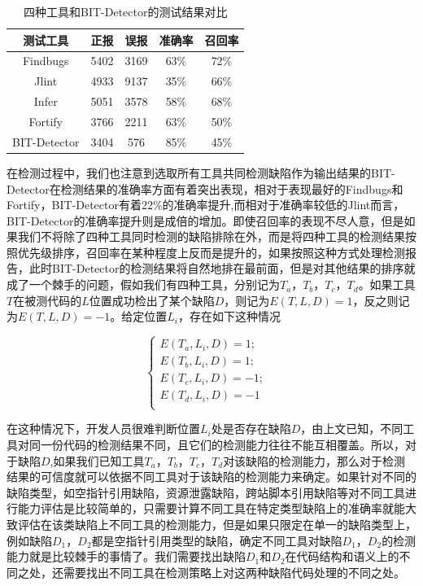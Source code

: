 \begin{table}
	\centering
	\caption{四种工具和BIT-Detector的测试结果对比} \label{tab:table3-1}
	\begin{tabular*}{0.9\textwidth}{@{\extracolsep{\fill}}ccccc}
		\toprule
		测试工具	&正报	&误报	&准确率	&召回率 \\
		\midrule
		Findbugs	&5402	&3169	&63\%	&72\% \\
		Jlint	&4933	&9137	&35\%	&66\% \\
		Infer	&5051	&3578	&58\%	&68\% \\
		Fortify	&3766	&2211	&63\%	&50\% \\
		BIT-Detector	&3404	&576	&85\%	&45\% \\
		\bottomrule
	\end{tabular*}
\end{table}

在检测过程中，我们也注意到选取所有工具共同检测缺陷作为输出结果的BIT-Detector在检测结果的准确率方面有着突出表现，相对于表现最好的Findbugs和Fortify，BIT-Detector有着22\%的准确率提升,而相对于准确率较低的Jlint而言，BIT-Detector的准确率提升则是成倍的增加。即使召回率的表现不尽人意，但是如果我们不将除了四种工具同时检测的缺陷排除在外，而是将四种工具的检测结果按照优先级排序，召回率在某种程度上反而是提升的，如果按照这种方式处理检测报告，此时BIT-Detector的检测结果将自然地排在最前面，但是对其他结果的排序就成了一个棘手的问题，假如我们有四种工具，分别记为$T_a$，$T_b$，$T_c$，$T_d$。如果工具$T$在被测代码的$L$位置成功检出了某个缺陷$D$，则记为$E(T,L,D)=1$，反之则记为$E(T,L,D)=-1$。给定位置$L_i$，存在如下这种情况

\begin{equation*}  
	\left\{  
	\begin{array}{lr}  
	E(T_{a},L_{i},D)=1; &  \\  
	E(T_{b},L_{i},D)=1; &  \\  
	E(T_{c},L_{i},D)=-1; &  \\  
	E(T_{d},L_{i},D)=-1&  \\  
	\end{array}  
	\right.  
\end{equation*} 

在这种情况下，开发人员很难判断位置$L_i$处是否存在缺陷$D$，由上文已知，不同工具对同一份代码的检测结果不同，且它们的检测能力往往不能互相覆盖。所以，对于缺陷$D$,如果我们已知工具$T_a$，$T_b$，$T_c$，$T_d$对该缺陷的检测能力，那么对于检测结果的可信度就可以依据不同工具对于该缺陷的检测能力来确定。如果针对不同的缺陷类型，如空指针引用缺陷，资源泄露缺陷，跨站脚本引用缺陷等对不同工具进行能力评估是比较简单的，只需要计算不同工具在特定类型缺陷上的准确率就能大致评估在该类缺陷上不同工具的检测能力，但是如果只限定在单一的缺陷类型上，例如缺陷$D_1$，$D_2$都是空指针引用类型的缺陷，确定不同工具对缺陷$D_1$，$D_2$的检测能力就是比较棘手的事情了。我们需要找出缺陷$D_1$和$D_2$在代码结构和语义上的不同之处，还需要找出不同工具在检测策略上对这两种缺陷代码处理的不同之处。

